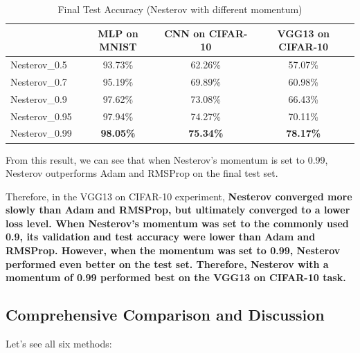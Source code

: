 \documentclass[12pt]{article}
\begin{document}
\begin{table}[H]
\centering
\caption{Final Test Accuracy (Nesterov with different momentum)}
\label{tab:nesterov_study}
\begin{tabular}{|l|c|c|c|}
\hline
              & MLP on MNIST & CNN on CIFAR-10 & VGG13 on CIFAR-10 \\ \hline
Nesterov\_0.5  & 93.73\%      & 62.26\%         & 57.07\%           \\ \hline
Nesterov\_0.7  & 95.19\%      & 69.89\%         & 60.98\%           \\ \hline
Nesterov\_0.9  & 97.62\%      & 73.08\%         & 66.43\%           \\ \hline
Nesterov\_0.95 & 97.94\%      & 74.27\%         & 70.11\%           \\ \hline
Nesterov\_0.99 & \textbf{98.05\%} & \textbf{75.34\%}  & \textbf{78.17\%}    \\ \hline
\end{tabular}
\end{table}

From this result, we can see that when Nesterov's momentum is set to 0.99, Nesterov outperforms Adam and RMSProp on the final test set.

Therefore, in the VGG13 on CIFAR-10 experiment, \textbf{Nesterov converged more slowly than Adam and RMSProp, but ultimately converged to a lower loss level. When Nesterov's momentum was set to the commonly used 0.9, its validation and test accuracy were lower than Adam and RMSProp. However, when the momentum was set to 0.99, Nesterov performed even better on the test set. Therefore, Nesterov with a momentum of 0.99 performed best on the VGG13 on CIFAR-10 task.}

\subsection{Comprehensive Comparison and Discussion}

Let's see all six methods:
\end{document}
